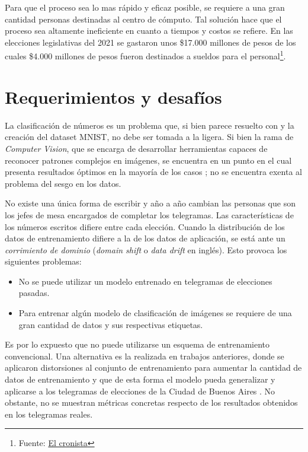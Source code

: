 \documentclass[a4paper, twoside]{report}
\begin{document}
Para que el proceso sea lo mas r\'apido y eficaz posible, se requiere a una gran cantidad personas destinadas al centro
de c\'omputo. Tal soluci\'on hace que el proceso sea altamente ineficiente en cuanto a tiempos y costos se refiere. En
las elecciones legislativas del 2021 se gastaron unos \$17.000 millones de pesos de los cuales \$4.000 millones de
pesos fueron destinados a sueldos para el personal\footnote{Fuente:
	\href{https://www.cronista.com/economia-politica/Elecciones-legislativas-2021-cuanto-mas-se-gastara-por-el-coronavirus-segun-el-Presupuesto-20201004-0006.html}{El
		cronista}}.

\section*{Requerimientos y desafíos}

La clasificaci\'on de n\'umeros es un problema que, si bien parece resuelto con \cite{lecun1998gradient} y la
creaci\'on del dataset MNIST, no debe ser tomada a la ligera. Si bien la rama de {\it Computer Vision}, que se encarga
de desarrollar herramientas capaces de reconocer patrones complejos en im\'agenes, se encuentra en un punto en el cual
presenta resultados \'optimos en la mayor\'ia de los casos \cite{szeliski2010computer, redmon2016yolo}; no se encuentra
exenta al problema del sesgo en los datos.

No existe una \'unica forma de escribir y a\~{n}o a a\~{n}o cambian las personas que son los jefes de mesa encargados
de completar los telegramas. Las caracter\'isticas de los n\'umeros escritos difiere entre cada elecci\'on. Cuando la
distribuci\'on de los datos de entrenamiento difiere a la de los datos de aplicaci\'on, se est\'a ante un {\it
		corrimiento de dominio} ({\it domain shift} o {\it data drift} en ingl\'es). Esto provoca los siguientes problemas:

\begin{itemize}
	\item No se puede utilizar un modelo entrenado en telegramas de elecciones pasadas.
	\item Para entrenar alg\'un modelo de clasificaci\'on de im\'agenes se requiere de una gran cantidad de datos y sus
	      respectivas etiquetas.
\end{itemize}

Es por lo expuesto que no puede utilizarse un esquema de entrenamiento convencional. Una alternativa es la realizada en
trabajos anteriores, donde se aplicaron distorsiones al conjunto de entrenamiento para aumentar la cantidad de datos de
entrenamiento y que de esta forma el modelo pueda generalizar y aplicarse a los telegramas de elecciones de la Ciudad
de Buenos Aires \cite{lamagna2016lectura}. No obstante, no se muestran m\'etricas concretas respecto de los resultados
obtenidos en los telegramas reales.
\end{document}
